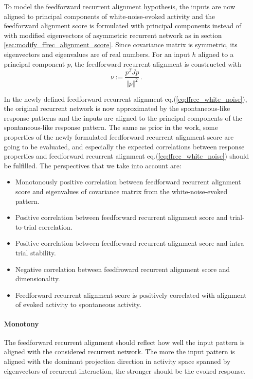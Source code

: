 \documentclass[11pt]{article}
\begin{document}
{	To model the feedforward recurrent alignment hypothesis, the inputs are now aligned to principal components of white-noise-evoked activity and the feedforward alignment score is formulated with principal components instead of with modified eigenvectors of asymmetric recurrent network as in section \ref{sec:modify_ffrec_alignment_score}. Since covariance matrix is symmetric, its eigenvectors and eigenvalues are of real numbers. For an input $h$ aligned to a principal component $p$, the feedforward recurrent alignment is constructed with 
		\begin{equation} \label{eq:ffrec_white_noise}
			\nu := \frac{p^T J p}{\Vert p \Vert^2} \, .
		\end{equation}
	
	In the newly defined feedforward recurrent alignment eq.(\ref{eq:ffrec_white_noise}), the original recurrent network is now approximated by the spontaneous-like response patterns and the inputs are aligned to the principal components of the spontaneous-like response pattern. The same as prior in the work, some properties of the newly formulated feedforward recurrent alignment score are going to be evaluated, and especially the expected correlations between response properties and feedforward recurrent alignment eq.(\ref{eq:ffrec_white_noise}) should be fulfilled. The perspectives that we take into account are:
		\begin{itemize}
			\item Monotonously positive correlation between feedforward recurrent alignment score and eigenvalues of covariance matrix from the white-noise-evoked pattern.
			\item Positive correlation between feedforward recurrent alignment score and trial-to-trial correlation.
			\item Positive correlation between feedforward recurrent alignment score and intra-trial stability.
			\item Negative correlation between feedfroward recurrent alignment score and dimensionality.
			\item Feedforward recurrent alignment score is positively correlated with alignment of evoked activity to spontaneous activity.
		\end{itemize}
	
	\paragraph{Monotony} The feedforward recurrent alignment should reflect how well the input pattern is aligned with the considered recurrent network. The more the input pattern is aligned with the dominant projection direction in activity space spanned by eigenvectors of recurrent interaction, the stronger should be the evoked response. %
	
}
\end{document}

